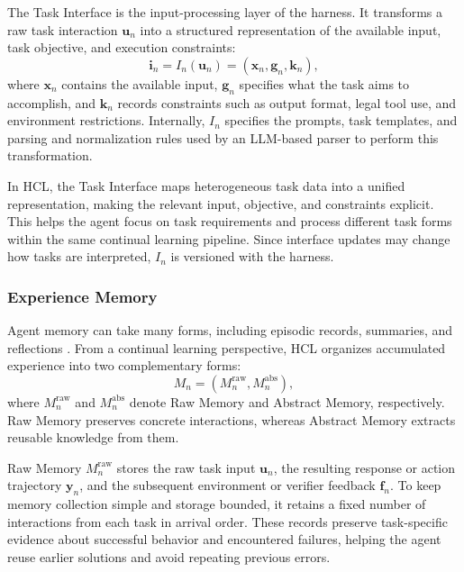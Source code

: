 \documentclass{article}
\begin{document}
The Task Interface is the input-processing layer of the harness. It transforms
a raw task interaction $\mathbf{u}_n$ into a structured representation of the
available input, task objective, and execution constraints:
\begin{equation}
\label{eq:task_interface}
\mathbf{i}_n
=
I_n\left(\mathbf{u}_n\right)
=
\left(
\mathbf{x}_n,
\mathbf{g}_n,
\mathbf{k}_n
\right),
\end{equation}
where $\mathbf{x}_n$ contains the available input,
$\mathbf{g}_n$ specifies what the task aims to accomplish, and
$\mathbf{k}_n$ records constraints such as output format, legal tool use, and
environment restrictions. Internally, $I_n$ specifies the prompts, task
templates, and parsing and normalization rules used by an LLM-based parser to
perform this transformation.

In HCL, the Task Interface maps heterogeneous task data into a unified
representation, making the relevant input, objective, and constraints explicit.
This helps the agent focus on task requirements and process different task
forms within the same continual learning pipeline. Since interface updates may
change how tasks are interpreted, $I_n$ is versioned with the harness.

\subsubsection{Experience Memory}
\label{sec:experience_memory}

Agent memory can take many forms, including episodic records, summaries, and
reflections
\citep{
park2023generativeagentsinteractivesimulacra,
packer2024memgptllmsoperatingsystems,
zhong2024memorybank,
shinn2023reflexion,
wang2024agentworkflowmemory}. From a continual learning perspective, HCL
organizes accumulated experience into two complementary forms:
\begin{equation}
\label{eq:experience_memory}
M_n
=
\left(
M_n^{\mathrm{raw}},
M_n^{\mathrm{abs}}
\right),
\end{equation}
where $M_n^{\mathrm{raw}}$ and $M_n^{\mathrm{abs}}$ denote Raw Memory and
Abstract Memory, respectively. Raw Memory preserves concrete interactions,
whereas Abstract Memory extracts reusable knowledge from them.

Raw Memory $M_n^{\mathrm{raw}}$ stores the raw task input $\mathbf{u}_n$, the
resulting response or action trajectory $\mathbf{y}_n$, and the subsequent
environment or verifier feedback $\mathbf{f}_n$. To keep memory collection
simple and storage bounded, it retains a fixed number of interactions from each
task in arrival order. These records preserve task-specific evidence about
successful behavior and encountered failures, helping the agent reuse earlier
solutions and avoid repeating previous errors.
\end{document}
